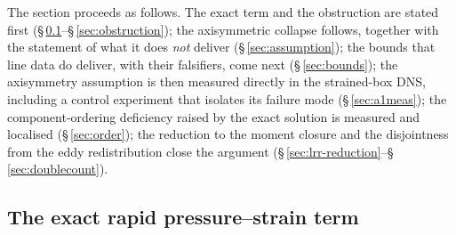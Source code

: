 \documentclass[lineno]{JFM-FLM_Au}
\begin{document}
The section proceeds as follows. The exact term and the obstruction are
stated first (\S\,\ref{sec:exact-pi}--\S\,\ref{sec:obstruction}); the
axisymmetric collapse follows, together with the statement of what it does
\emph{not} deliver (\S\,\ref{sec:assumption}); the bounds that line data do
deliver, with their falsifiers, come next (\S\,\ref{sec:bounds}); the
axisymmetry assumption is then measured directly in the strained-box DNS,
including a control experiment that isolates its failure mode
(\S\,\ref{sec:a1meas}); the component-ordering deficiency raised by the
exact solution is measured and localised (\S\,\ref{sec:order}); the
reduction to the moment closure and the disjointness from the eddy
redistribution close the argument
(\S\,\ref{sec:lrr-reduction}--\S\,\ref{sec:doublecount}).

\subsection{The exact rapid pressure--strain term}\label{sec:exact-pi}
\end{document}
